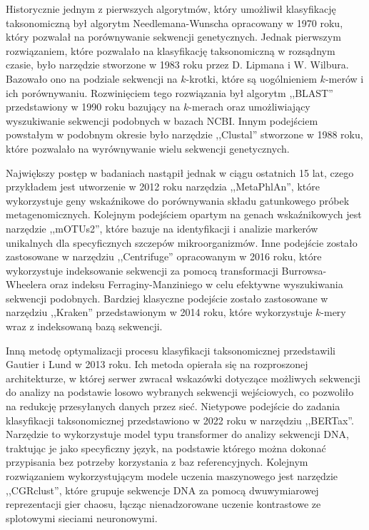         Historycznie jednym z pierwszych algorytmów, który umożliwił klasyfikację taksonomiczną był algorytm Needlemana-Wunscha\cite{Needleman:1970} opracowany w 1970 roku, który pozwalał na porównywanie sekwencji genetycznych. Jednak pierwszym rozwiązaniem, które pozwalało na klasyfikację taksonomiczną w rozsądnym czasie, było narzędzie stworzone w 1983 roku przez D. Lipmana i W. Wilbura\cite{Wilbur:1983}. Bazowało ono na podziale sekwencji na $k$-krotki, które są uogólnieniem $k$-merów i ich porównywaniu. Rozwinięciem tego rozwiązania był algorytm ,,BLAST'' przedstawiony w 1990 roku\cite{Altschul:1990} bazujący na $k$-merach oraz umożliwiający wyszukiwanie sekwencji podobnych w bazach NCBI. Innym podejściem powstałym w podobnym okresie było narzędzie ,,Clustal''\cite{Higgins:1988} stworzone w 1988 roku, które pozwalało na wyrównywanie wielu sekwencji genetycznych.

        Największy postęp w badaniach nastąpił jednak w ciągu ostatnich 15 lat, czego przykładem jest utworzenie w 2012 roku narzędzia ,,MetaPhlAn''\cite{Segata:2012}, które wykorzystuje geny wskaźnikowe do porównywania składu gatunkowego próbek metagenomicznych. Kolejnym podejściem opartym na genach wskaźnikowych jest narzędzie ,,mOTUs2''\cite{Milanese:2019}, które bazuje na identyfikacji i analizie markerów unikalnych dla specyficznych szczepów mikroorganizmów. Inne podejście zostało zastosowane w narzędziu ,,Centrifuge''\cite{Kim:2016} opracowanym w 2016 roku, które wykorzystuje indeksowanie sekwencji za pomocą transformacji Burrowsa-Wheelera\cite{Burrows:1994} oraz indeksu Ferraginy-Manziniego\cite{Ferragina:2000} w celu efektywne wyszukiwania sekwencji podobnych. Bardziej klasyczne podejście zostało zastosowane w narzędziu ,,Kraken''\cite{Wood:2014} przedstawionym w 2014 roku, które wykorzystuje $k$-mery wraz z indeksowaną bazą sekwencji.

        Inną metodę optymalizacji procesu klasyfikacji taksonomicznej przedstawili Gautier i Lund w 2013 roku\cite{Gautier:2013}. Ich metoda opierała się na rozproszonej architekturze, w której serwer zwracał wskazówki dotyczące możliwych sekwencji do analizy na podstawie losowo wybranych sekwencji wejściowych, co pozwoliło na redukcję przesyłanych danych przez sieć. Nietypowe podejście do zadania klasyfikacji taksonomicznej przedstawiono w 2022 roku w narzędziu ,,BERTax''\cite{Mock:2022}. Narzędzie to wykorzystuje model typu transformer\cite{Transformers} do analizy sekwencji DNA, traktując je jako specyficzny język, na podstawie którego można dokonać przypisania bez potrzeby korzystania z baz referencyjnych. Kolejnym rozwiązaniem wykorzystującym modele uczenia maszynowego jest narzędzie ,,CGRclust''\cite{Alipour:2024}, które grupuje sekwencje DNA za pomocą dwuwymiarowej reprezentacji gier chaosu, łącząc nienadzorowane uczenie kontrastowe ze splotowymi sieciami neuronowymi.

